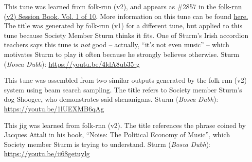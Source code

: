 \documentclass[a4paper,notitlepage,twoside]{book}
\begin{document}
{}  
\hypertarget{jig:GarrettFarmors}{}
This tune was learned from folk-rnn (v2),
and appears as \#2857 in
the \href{https://highnoongmt.wordpress.com/2018/01/05/volumes-1-20-of-folk-rnn-v1-transcriptions}{folk-rnn (v2) Session Book, Vol. 1 of 10}.
More information on this tune can be found \href{https://highnoongmt.wordpress.com/2017/12/02/folk-rnn-v2-tune-2857/}{here.}
The title was generated by folk-rnn (v1) for a different tune, 
but applied to this tune because Society Member Sturm thinks it fits.
One of Sturm's Irish accordion teachers says this tune is {\em not} good -- actually, ``it's not even music'' --
which motivates Sturm to play it often because he strongly believes otherwise.
Sturm ({\em Bosca Dubh}): \url{https://youtu.be/4ldA8ub35-g}

{}  
\hypertarget{jig:ShoogeesShenanigans}{}
This tune was assembled from two similar outputs generated by 
the folk-rnn (v2) system using beam search sampling.
The title refers to Society member Sturm's dog Shoogee, 
who demonstrates said shenanigans. 
Sturm ({\em Bosca Dubh}): \url{https://youtu.be/1lUEXMB6qAg}

{}  
\hypertarget{jig:CrisisProliferation}{}
This jig was learned from folk-rnn (v2).
The title references the phrase coined by Jacques Attali in his book,
``Noise: The Political Economy of Music'',
which Society member Sturm is trying to understand.
Sturm ({\em Bosca Dubh}): \url{https://youtu.be/ii68getuylg}

\clearpage
\end{document}
